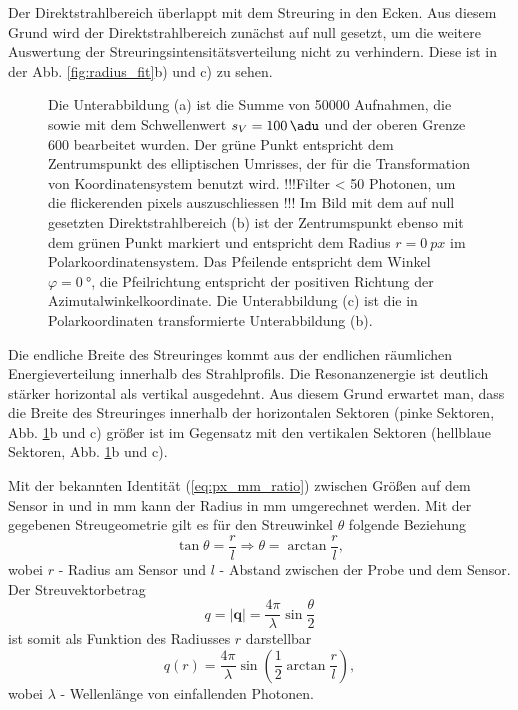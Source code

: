 \noindent
Der Direktstrahlbereich überlappt mit dem Streuring in den Ecken. Aus diesem Grund wird der Direktstrahlbereich zunächst auf null gesetzt, um die weitere Auswertung der Streuringsintensitätsverteilung nicht zu verhindern. Diese ist in der Abb. \ref{fig:radius_fit}b) und c) zu sehen.
\begin{figure}[H]
    \centering
    
    \caption{Die Unterabbildung (a) ist die Summe von \num{50000} Aufnahmen, die sowie mit dem Schwellenwert $s_V = \SI{100}{\adu}$ und der oberen Grenze \SI{600}{\adu} bearbeitet wurden. Der grüne Punkt entspricht dem Zentrumspunkt des elliptischen Umrisses, der für die Transformation von Koordinatensystem benutzt wird. !!!Filter < 50 Photonen, um die flickerenden pixels auszuschliessen !!! Im Bild mit dem auf null gesetzten Direktstrahlbereich (b) ist der Zentrumspunkt ebenso mit dem grünen Punkt markiert und entspricht dem Radius $r=\SI{0}{px}$ im Polarkoordinatensystem. Das Pfeilende entspricht dem Winkel $\varphi = \SI{0}{\degree}$, die Pfeilrichtung entspricht der positiven Richtung der Azimutalwinkelkoordinate. Die Unterabbildung (c) ist die in Polarkoordinaten transformierte Unterabbildung (b).}
    \label{fig:th-100-200-maske-radial-transform}
\end{figure}
\noindent
Die endliche Breite des Streuringes kommt aus der endlichen räumlichen Energieverteilung innerhalb des Strahlprofils. Die Resonanzenergie ist deutlich stärker horizontal als vertikal ausgedehnt. Aus diesem Grund erwartet man, dass die Breite des Streuringes innerhalb der horizontalen Sektoren (pinke Sektoren, Abb. \ref{fig:th-100-200-maske-radial-transform}b und c) größer ist im Gegensatz mit den vertikalen Sektoren (hellblaue Sektoren, Abb. \ref{fig:th-100-200-maske-radial-transform}b und c).


\noindent
Mit der bekannten Identität (\ref{eq:px_mm_ratio}) zwischen Größen auf dem Sensor in \si{\px} und in \si{\milli\meter} kann der Radius in \si{\milli\meter} umgerechnet werden. Mit der gegebenen Streugeometrie gilt es für den Streuwinkel $\theta$  folgende Beziehung
\begin{equation}
    \tan{\theta} = \frac{r}{l} \Rightarrow \theta = \arctan \frac{r}{l},
\end{equation}
wobei $r$ - Radius am Sensor und $l$ - Abstand zwischen der Probe und dem Sensor. Der Streuvektorbetrag 
\begin{equation}
    q = \left|\mathbf{q}\right| = \frac{4\pi}{\lambda}\sin{\frac{\theta}{2}}
\end{equation}
ist somit als Funktion des Radiusses $r$ darstellbar
\begin{equation}
    q(r) = \frac{4\pi}{\lambda}\sin\left(\frac{1}{2}\arctan\frac{r}{l}\right),
    \label{eq:streuvektor_von_radius}
\end{equation}
wobei $\lambda$ - Wellenlänge von einfallenden Photonen.

